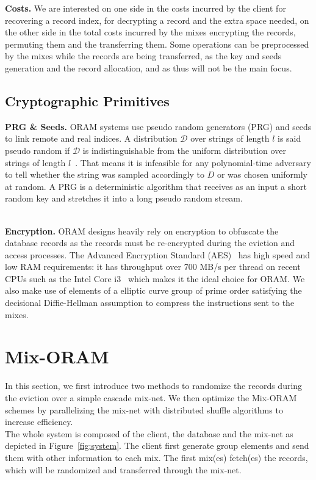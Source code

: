 \documentclass[USenglish,oneside,twocolumn]{article}
\begin{document}
\noindent\textbf{Costs.} We are interested on one side in the costs incurred by the client for recovering a record index, for decrypting a record and the extra space needed, on the other side in the total costs incurred by the mixes encrypting the records, permuting them and the transferring them.
Some operations can be preprocessed by the mixes while the records are being transferred, as the key and seeds generation and the record allocation, and as thus will not be the main focus.
%
\subsection{Cryptographic Primitives}

\noindent\textbf{PRG \& Seeds.}
ORAM systems use pseudo random generators (PRG) and seeds to link remote and real indices. A distribution $\mathcal{D}$ over strings of length $l$ is said pseudo random if $\mathcal{D}$ is indistinguishable from the uniform distribution over strings of length $l$~\cite{katz2014introduction}. That means it is infeasible for any polynomial-time adversary to tell whether the string was sampled accordingly to $D$ or was chosen uniformly at random. A PRG is a deterministic algorithm that receives as an input a short random key and stretches it into a long pseudo random stream.\\\

\noindent\textbf{Encryption.}
ORAM designs heavily rely on encryption  to obfuscate the database records as the records must be re-encrypted during the eviction and access processes.
The Advanced Encryption Standard (AES)~\cite{daemen2013design} has high speed and low RAM requirements: it has throughput over 700 MB/s per thread on recent CPUs such as the Intel Core i3~\cite{mcwilliams2014hardware} which makes it the ideal choice for ORAM.
We also make use of elements of a elliptic curve group of prime order satisfying the decisional Diffie-Hellman assumption to compress the instructions sent to the mixes.
%
\section{Mix-ORAM}\label{Mix-ORAM}
In this section, we first introduce two methods to randomize the records during the eviction over a simple cascade mix-net. We then optimize the Mix-ORAM schemes by parallelizing the mix-net with distributed shuffle algorithms to increase efficiency.\\


The whole system is composed of the client, the database and the mix-net as depicted in Figure~\ref{fig:system}.
The client first generate group elements and send them with other information to each mix. The first mix(es) fetch(es) the records, which will be randomized and transferred through the mix-net. 
\end{document}
